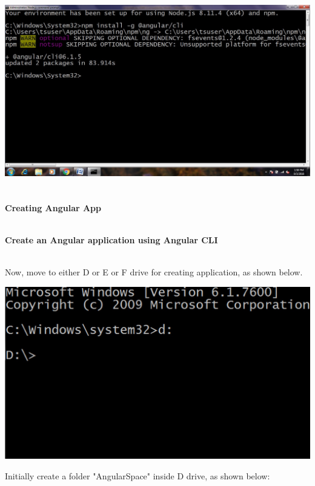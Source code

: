 \documentclass{article}
\begin{document}
\begin{enumerate}
	\begin{center}
		\noindent \includegraphics*[width=5.41in, height=3.04in]{IMG-01-15}
	\end{center}
\end{enumerate}

\newpage
\noindent \\ {\large \textbf{Creating Angular App}}

\noindent \textbf{}

\noindent \\ \textbf{Create an Angular application using Angular CLI}

\noindent \\ Now, move to either D or E or F drive for creating application, as shown below.

\begin{center}
	\noindent \includegraphics*[width=5.26in, height=2.96in]{IMG-01-16}
\end{center}

\noindent Initially create a folder "AngularSpace" inside D drive, as shown below:
\end{document}
